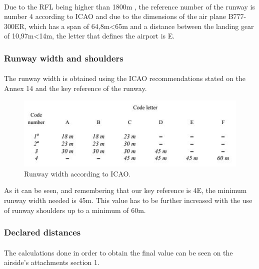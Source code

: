 			\paragraph{}Due to the RFL being higher than 1800m , the reference number of the runway is number 4 according to ICAO and due to the dimensions of the air plane B777-300ER, which has a span of 64,8m<65m and a distance between the landing gear of 10,97m<14m, the letter that defines the airport is E.
			
			\subsubsection{Runway width and shoulders}
			\paragraph{}The runway width is obtained using the ICAO recommendations stated on the Annex 14 and the key reference of the runway. 
			
			\begin{figure}[H]
				\centering
				\includegraphics[clip, trim=0cm 0cm 0cm 0cm, width=1\textwidth]{./images/Annex14/RunwayWidth}
				\caption{Runway width according to ICAO.} %
				\label{} %
			\end{figure}
		
			As it can be seen, and remembering that our key reference is 4E, the minimum runway width needed is 45m. This value has to be further increased with the use of runway shoulders up to a minimum of 60m. 

			\subsubsection{Declared distances}
			\paragraph{} The calculations done in order to obtain the final value can be seen on the airside’s attachments section 1. 
			
